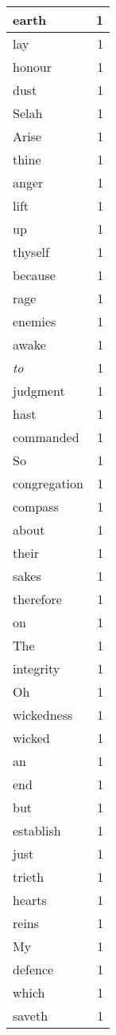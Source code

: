 \begin{center}
\begin{longtable}{l|r}
earth & 1 \\ \hline
lay & 1 \\ \hline
honour & 1 \\ \hline
dust & 1 \\ \hline
Selah & 1 \\ \hline
Arise & 1 \\ \hline
thine & 1 \\ \hline
anger & 1 \\ \hline
lift & 1 \\ \hline
up & 1 \\ \hline
thyself & 1 \\ \hline
because & 1 \\ \hline
rage & 1 \\ \hline
enemies & 1 \\ \hline
awake & 1 \\ \hline
\emph{to} & 1 \\ \hline
judgment & 1 \\ \hline
hast & 1 \\ \hline
commanded & 1 \\ \hline
So & 1 \\ \hline
congregation & 1 \\ \hline
compass & 1 \\ \hline
about & 1 \\ \hline
their & 1 \\ \hline
sakes & 1 \\ \hline
therefore & 1 \\ \hline
on & 1 \\ \hline
The & 1 \\ \hline
integrity & 1 \\ \hline
Oh & 1 \\ \hline
wickedness & 1 \\ \hline
wicked & 1 \\ \hline
an & 1 \\ \hline
end & 1 \\ \hline
but & 1 \\ \hline
establish & 1 \\ \hline
just & 1 \\ \hline
trieth & 1 \\ \hline
hearts & 1 \\ \hline
reins & 1 \\ \hline
My & 1 \\ \hline
defence & 1 \\ \hline
which & 1 \\ \hline
saveth & 1 \\ \hline

\end{longtable}
\end{center}
